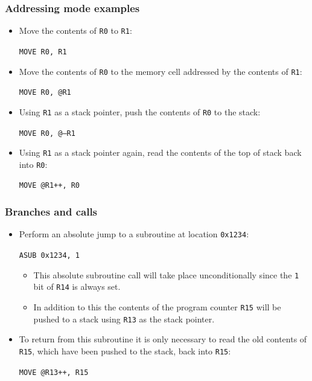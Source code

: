 \documentclass{beamer}
\begin{document}
%
   \begin{frame}
    \frametitle{Addressing mode examples}
    \begin{itemize}
     \item Move the contents of {\tt R0} to {\tt R1}:
      \begin{center}
       {\tt MOVE R0, R1}
      \end{center}
     \item Move the contents of {\tt R0} to the memory cell addressed by the
      contents of {\tt R1}:
      \begin{center}
       {\tt MOVE R0, @R1}
      \end{center}
     \item Using {\tt R1} as a stack pointer, push the contents of {\tt R0}
      to the stack:
      \begin{center}
       {\tt MOVE R0, @--R1}
      \end{center}
     \item Using {\tt R1} as a stack pointer again, read the contents of the 
      top of stack back into {\tt R0}:
      \begin{center}
       {\tt MOVE @R1++, R0}
      \end{center}
    \end{itemize}
   \end{frame}
%
   \begin{frame}
    \frametitle{Branches and calls}
    \begin{itemize}
     \item Perform an absolute jump to a subroutine at location {\tt 0x1234}:
      \begin{center}
       {\tt ASUB 0x1234, 1}
      \end{center}
      \begin{itemize}
       \item This absolute subroutine call will take place unconditionally 
        since the {\tt 1} bit of {\tt R14} is always set. 
       \item In addition to this the contents of the program counter
        {\tt R15} will be pushed to a stack using {\tt R13} as the stack
        pointer.
      \end{itemize}
     \item To return from this subroutine it is only necessary to read the
      old contents of {\tt R15}, which have been pushed to the stack, back
      into {\tt R15}:
      \begin{center}
       {\tt MOVE @R13++, R15}
      \end{center}
    \end{itemize}
   \end{frame}
\end{document}
